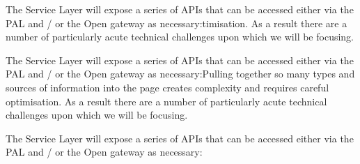 \documentclass[10pt, a4paper, parskip=half,
               enlargefirstpage ]{scrlttr2}
\begin{document}
The Service Layer will expose a series of APIs that can be accessed either via the PAL and / or the Open gateway as necessary:timisation. As a result there are a number of particularly acute technical challenges upon which we will be focusing.

The Service Layer will expose a series of APIs that can be accessed either via the PAL and / or the Open gateway as necessary:Pulling together so many types and sources of information into the page creates complexity and requires careful optimisation. As a result there are a number of particularly acute technical challenges upon which we will be focusing.

The Service Layer will expose a series of APIs that can be accessed either via the PAL and / or the Open gateway as necessary:
\end{document}
